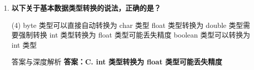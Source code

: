 \documentclass[12pt, a4paper]{ctexart}
\newcommand{\code}[1]{\texttt{#1}}
\begin{document}
\begin{enumerate}[label=\textbf{\arabic*.}, leftmargin=*, itemsep=1.5em]
\begin{bluebox}{答案与深度解析}
		      \textbf{【应背诵知识点（命题人思维版）】}
		      \begin{enumerate}[leftmargin=*, nosep]
			      \item \textbf{标识符合法字符}：字母、\code{\_}、\code{\$}、数字（非首位）
			      \item \textbf{关键字黑名单}：54 个关键字不可用（包括 \code{var} 在局部变量中可用但类型名不可）
			      \item \textbf{选项辨析速查表}：
			            \begin{tabular}{|c|c|c|c|}
				            \hline
				            \textbf{选项} & \textbf{合法性} & \textbf{错误根源} & \textbf{记忆口诀} \\
				            \hline
				            2ab         & 否            & 数字开头          & "数字不能打头阵"     \\
				            \hline
				            \_ab        & 是            & -             & "下划线美元能开头"    \\
				            \hline
				            ab-c        & 否            & 含运算符          & "减号那是运算符"     \\
				            \hline
				            class       & 否            & 关键字           & "关键字是保留字"     \\
				            \hline
			            \end{tabular}
		      \end{enumerate}

		      \textbf{【命题趋势与实战策略】}
		      \begin{itemize}[leftmargin=*, nosep]
			      \item \textbf{考场秒杀三步法}：
			            \begin{enumerate}
				            \item 看首字符（排除数字）
				            \item 看特殊符（排除除\_ \$外的符号）
				            \item 看关键字（排除保留字）
			            \end{enumerate}
		      \end{itemize}
	      \end{bluebox}

	\item \textbf{以下关于基本数据类型转换的说法，正确的是？}
	      \begin{tasks}(4)
		      \task byte 类型可以直接自动转换为 char 类型
		      \task float 类型转换为 double 类型需要强制转换
		      \task int 类型转换为 float 类型可能丢失精度
		      \task boolean 类型可以转换为 int 类型
	      \end{tasks}
	      \begin{bluebox}{答案与深度解析}
		      \textbf{答案：C. int 类型转换为 float 类型可能丢失精度}


\end{bluebox}
\end{enumerate}
\end{document}
